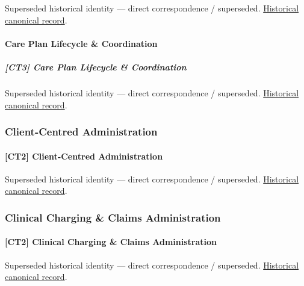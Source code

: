 \par\label{element:e31407cea7624632a8ed2dc53b09d726}
Superseded historical identity — direct correspondence / superseded. \href{../../../../continuum/strategy/capability/e31407cea7624632a8ed2dc53b09d726.md}{Historical canonical record}.\par

\paragraph{Care Plan Lifecycle \& Coordination}

\subparagraph{[CT3] Care Plan Lifecycle \& Coordination}

\par\label{element:689bb3f8a24249b79f787e1f48eb268d}
Superseded historical identity — direct correspondence / superseded. \href{../../../../continuum/strategy/capability/689bb3f8a24249b79f787e1f48eb268d.md}{Historical canonical record}.\par

\subsubsection{Client-Centred Administration}

\paragraph{[CT2] Client-Centred Administration}

\par\label{element:232b3fb2ff204c9b9ff7a60ff6a7a32d}
Superseded historical identity — direct correspondence / superseded. \href{../../../../continuum/strategy/capability/232b3fb2ff204c9b9ff7a60ff6a7a32d.md}{Historical canonical record}.\par

\subsubsection{Clinical Charging \& Claims Administration}

\paragraph{[CT2] Clinical Charging \& Claims Administration}

\par\label{element:44433108cc8f4f5f9d7581f9e5b29eb5}
Superseded historical identity — direct correspondence / superseded. \href{../../../../continuum/strategy/capability/44433108cc8f4f5f9d7581f9e5b29eb5.md}{Historical canonical record}.\par

